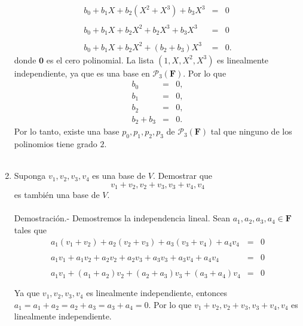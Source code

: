 \begin{enumerate}[\bfseries 1.]
	$$
	\begin{array}{rcl}
	    b_0+b_1X+b_2(X^2+X^3)+b_3X^3&=&0\\\\
	    b_0+b_1X+b_2X^2+b_2X^3 +b_3X^3&=&0\\\\
	    b_0+b_1X+b_2X^2+(b_2+b_3)X^3&=&0.
	\end{array}
	$$
	donde $\textbf{0}$ es el cero polinomial. La lista $\left(1,X,X^2,X^3\right)$ es linealmente independiente, ya que es una base en $\mathcal{P}_3(\textbf{F})$. Por lo que 
	$$
	\begin{array}{rcl}
	    b_0&=&0,\\
	    b_1&=&0,\\
	    b_2&=&0,\\ 
	    b_2+b_3&=&0.
	\end{array}
	$$
	Por lo tanto, existe una base $p_0,p_1,p_2,p_3$ de $\mathcal{P}_3(\textbf{F})$ tal que ninguno de los polinomios tiene grado $2$.\\\\

    \item Suponga $v_1,v_2,v_3,v_4$ es una base de $V$. Demostrar que 
    $$v_1+v_2,v_2+v_3,v_3+v_4,v_4$$
    es también una base de $V$.\\\\
	Demostración.-\; Demostremos la independencia lineal. Sean $a_1,a_2,a_3,a_4\in \textbf{F}$ tales que
	$$
	\begin{array}{rcl}
	    a_1(v_1+v_2)+a_2(v_2+v_3)+a_3(v_3+v_4)+a_4v_4&=&0\\\\
	    a_1v_1+a_1v_2+a_2v_2+a_2v_3+a_3v_3+a_3v_4+a_4v_4&=&0\\\\
	    a_1v_1+(a_1+a_2)v_2+(a_2+a_3)v_3+(a_3+a_4)v_4&=&0\\\\
	\end{array}
	$$
	Ya que $v_1,v_2,v_3,v_4$ es linealmente independiente, entonces $a_1=a_1+a_2=a_2+a_3=a_3+a_4=0$. Por lo que  $v_1+v_2,v_2+v_3,v_3+v_4,v_4$ es linealmente independiente.\\


\end{enumerate}
